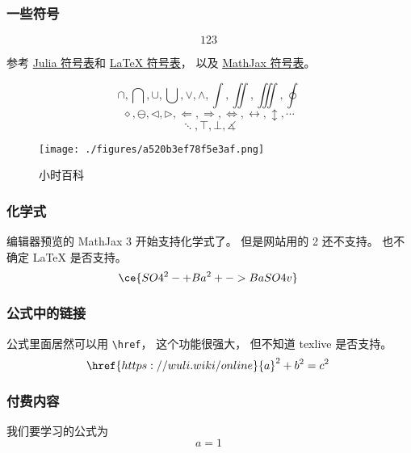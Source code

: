 
\subsubsection{一些符号}
\begin{equation}
123~
\end{equation}

参考 \href{https://docs.julialang.org/en/v1/manual/unicode-input/}{Julia 符号表}和 \href{https://oeis.org/wiki/List_of_LaTeX_mathematical_symbols}{LaTeX 符号表}， 以及 \href{http://www.onemathematicalcat.org/MathJaxDocumentation/TeXSyntax.htm}{MathJax 符号表}。

\begin{equation}
\cap, \bigcap, \cup, \bigcup, \vee, \wedge, \int, \iint, \iiint, \oint~
\end{equation}
\begin{equation}
\diamond, \ominus, \triangleleft, \triangleright, \Longleftarrow, \Longrightarrow, \iff, \leftrightarrow, \updownarrow, \cdots~
\end{equation}
\begin{equation}
\ddots, \top, \bot, \measuredangle~
\end{equation}

\begin{figure}[ht]
\centering
\texttt{[image: ./figures/a520b3ef78f5e3af.png]}
\caption{小时百科} \label{fig_test_1}
\end{figure}

\subsubsection{化学式}
编辑器预览的 MathJax 3 开始支持化学式了。 但是网站用的 2 还不支持。 也不确定 LaTeX 是否支持。
\begin{equation}
\ce{SO4^2- + Ba^2+ -> BaSO4 v}~
\end{equation}

\subsubsection{公式中的链接}
公式里面居然可以用 \verb|\href|， 这个功能很强大， 但不知道 texlive 是否支持。
\begin{equation}
\href{https://wuli.wiki/online}{a}^2 + b^2 = c^2~
\end{equation}

\subsubsection{付费内容}
我们要学习的公式为
\begin{equation}\label{eq_test_1}
a = 1~
\end{equation}

